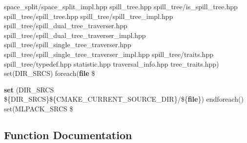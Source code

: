\begin{DoxyCompactItemize}
space\+\_\+split/space\+\_\+split\+\_\+impl.\+hpp spill\+\_\+tree.\+hpp spill\+\_\+tree/is\+\_\+spill\+\_\+tree.\+hpp spill\+\_\+tree/spill\+\_\+tree.\+hpp spill\+\_\+tree/spill\+\_\+tree\+\_\+impl.\+hpp spill\+\_\+tree/spill\+\_\+dual\+\_\+tree\+\_\+traverser.\+hpp spill\+\_\+tree/spill\+\_\+dual\+\_\+tree\+\_\+traverser\+\_\+impl.\+hpp spill\+\_\+tree/spill\+\_\+single\+\_\+tree\+\_\+traverser.\+hpp spill\+\_\+tree/spill\+\_\+single\+\_\+tree\+\_\+traverser\+\_\+impl.\+hpp spill\+\_\+tree/traits.\+hpp spill\+\_\+tree/typedef.\+hpp statistic.\+hpp traversal\+\_\+info.\+hpp tree\+\_\+traits.\+hpp) set(D\+I\+R\+\_\+\+S\+R\+CS) foreach({\bf file} \$
\item 
{\bf set} (D\+I\+R\+\_\+\+S\+R\+CS \$\{D\+I\+R\+\_\+\+S\+R\+CS\}\$\{C\+M\+A\+K\+E\+\_\+\+C\+U\+R\+R\+E\+N\+T\+\_\+\+S\+O\+U\+R\+C\+E\+\_\+\+D\+IR\}/\$\{{\bf file}\}) endforeach() set(M\+L\+P\+A\+C\+K\+\_\+\+S\+R\+CS \$
\end{DoxyCompactItemize}


\subsection{Function Documentation}
